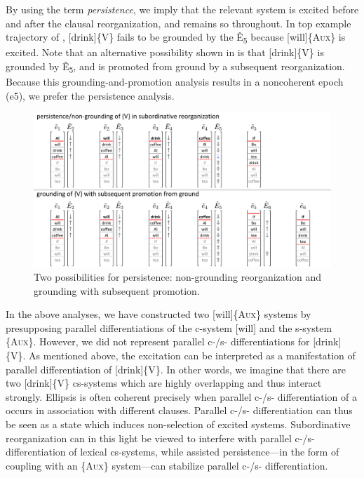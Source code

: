   By using the term \textit{persistence}, we imply that the relevant system is excited before and after the clausal reorganization, and remains so throughout. In top example trajectory of {}, [drink]\{V\} fails to be grounded by the  Ê\textsubscript{5} because [will]\{A\textsc{ux}\} is excited. Note that an alternative possibility shown in {} is that [drink]\{V\} is grounded by Ê\textsubscript{5},\textsubscript{} and is promoted from ground by a subsequent reorganization. Because this grounding-and-promotion analysis results in a noncoherent epoch (e5), we prefer the persistence analysis.

  
\begin{figure}
\includegraphics[width=\textwidth]{figures/Tilsen-img149.png}
\caption{Two possibilities for persistence: non-grounding reorganization and grounding with subsequent promotion.}
\label{fig:7:5}
\end{figure}
 

  In the above analyses, we have constructed two [will]\{A\textsc{ux}\} systems by presupposing parallel differentiations of the c-system [will] and the s-system \{A\textsc{ux}\}. However, we did not represent parallel c-/s- differentiations for [drink]\{V\}. As mentioned above, the excitation  can be interpreted as a manifestation of parallel differentiation of [drink]\{V\}. In other words, we imagine that there are two [drink]\{V\} cs-systems which are highly overlapping and thus interact strongly. Ellipsis is often coherent precisely when parallel c-/s- differentiation of a  occurs in association with different clauses. Parallel c-/s- differentiation can thus be seen as a state which induces non-selection of excited systems. Subordinative reorganization can in this light be viewed to interfere with parallel c-/s- differentiation of lexical cs-systems, while assisted persistence—in the form of coupling with an \{A\textsc{ux}\} system—can stabilize parallel c-/s- differentiation.

